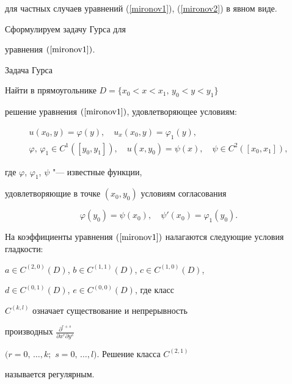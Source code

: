 для частных случаев уравнений (\ref{mironov1}), (\ref{mironov2}) в явном виде.





  Сформулируем задачу Гурса для


уравнения $(\ref{mironov1})$.


\begin{newthm}{Задача Гурса}


Найти в прямоугольнике $D=\{x_{0}<x<x_{1},\, y_{0}<y<y_{1}\}$


решение уравнения $(\ref{mironov1})$, удовлетворяющее условиям:


\begin{gather*}


u(x_{0},y)=\varphi(y),\quad u_{x}(x_{0},y)=\varphi_{1}(y), \\


\varphi,\,\varphi_{1}\in C^{1}([y_{0},y_{1}]),\quad


u(x,y_{0})=\psi(x),\quad \psi\in C^{2}([x_{0},x_{1}]),


\end{gather*}


где $\varphi$, $\varphi_{1}$, $\psi$ "--- известные функции,


удовлетворяющие в точке  $(x_{0},y_{0})$ условиям согласования


\begin{equation*}\label{mironovk6.3}


\varphi(y_{0})=\psi(x_{0}),\quad \psi'(x_{0})=\varphi_{1}(y_{0}).


\end{equation*}


\end{newthm}





На коэффициенты уравнения $(\ref{mironov1})$ налагаются следующие условия гладкости: 


$a\in C^{(2,0)}(D)$, $b\in C^{(1,1)}(D)$, $c\in C^{(1,0)}(D)$,


$d\in C^{(0,1)}(D)$, $e\in C^{(0,0)}(D)$, где класс


$C^{(k,l)}$ означает существование и непрерывность


производных $ \frac{\partial^{r+s}}{\partial x^{r} \partial y^{s}}$


$(r=0,\,\dots,k;$ $s=0,\,\dots,l).$ Решение класса $C^{(2,1)}$


называется регулярным.





